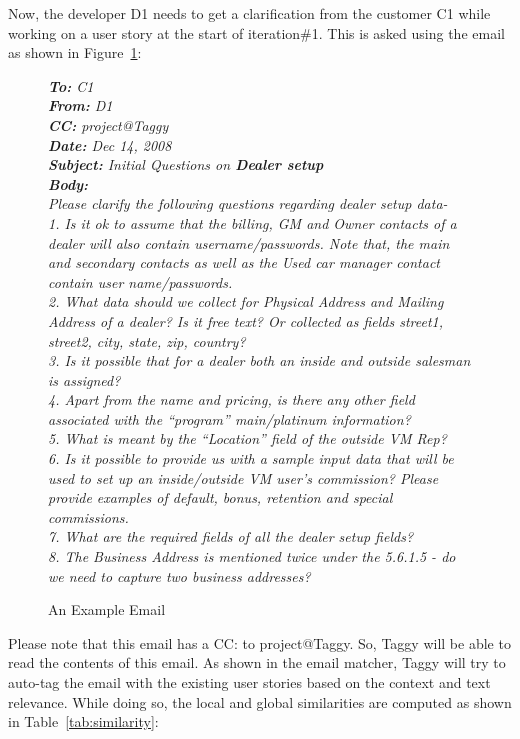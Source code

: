 Now, the developer D1 needs to get a clarification from the customer C1 while working on a user story at the start of iteration\#1. This is asked using the email as shown in Figure~\ref{fig:email}:

\begin{figure}
	\emph{\textbf{To:} C1}\\
	\emph{\textbf{From:} D1}\\
	\emph{\textbf{CC:} project@Taggy}\\
	\emph{\textbf{Date:} Dec 14, 2008}\\
	\emph{\textbf{Subject:} Initial Questions on \textbf{Dealer setup}}\\
	\emph{\textbf{Body:}\\
	Please clarify the following questions regarding dealer setup data-\\
	1. Is it ok to assume that the billing, GM and Owner contacts of a dealer will also contain username/passwords. Note that, the main and secondary contacts as well as the Used car manager contact contain user name/passwords.\\
	2. What data should we collect for Physical Address and Mailing Address of a dealer? Is it free text? Or collected as fields street1, street2, city, state, zip, country?\\
	3. Is it possible that for a dealer both an inside and outside salesman is assigned?\\
	4. Apart from the name and pricing, is there any other field associated with the ``program'' {main/platinum} information?\\
	5. What is meant by the ``Location'' field of the outside VM Rep?\\
	6. Is it possible to provide us with a sample input data that will be used to set up an inside/outside VM user's commission? Please provide examples of default, bonus, retention and special commissions.\\
	7. What are the required fields of all the dealer setup fields?\\
	8. The Business Address is mentioned twice under the 5.6.1.5 - do we need to capture two business addresses?
	}\\
	\caption{An Example Email}
	\label{fig:email}
\end{figure}

Please note that this email has a CC: to project@Taggy. So, Taggy will be able to read the contents of this email. As shown in the email matcher, Taggy will try to auto-tag the email with the existing user stories based on the context and text relevance. While doing so, the local and global similarities are computed as shown in Table~\ref{tab:similarity}:

